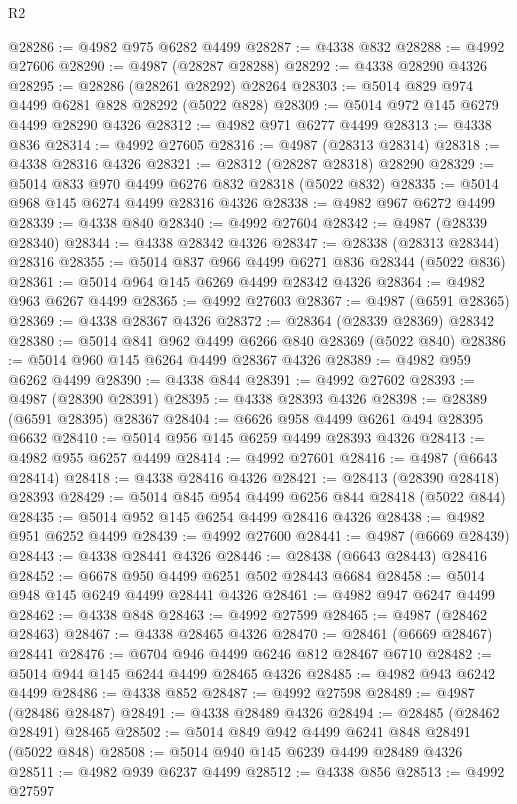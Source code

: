 \begin{lexlean}{R2}
\begin{coremodule}
@28286 := @4982 @975 @6282 @4499
@28287 := @4338 @832
@28288 := @4992 @27606
@28290 := @4987 (@28287 @28288)
@28292 := @4338 @28290 @4326
@28295 := @28286 (@28261 @28292) @28264
@28303 := @5014 @829 @974 @4499 @6281 @828 @28292 (@5022 @828)
@28309 := @5014 @972 @145 @6279 @4499 @28290 @4326
@28312 := @4982 @971 @6277 @4499
@28313 := @4338 @836
@28314 := @4992 @27605
@28316 := @4987 (@28313 @28314)
@28318 := @4338 @28316 @4326
@28321 := @28312 (@28287 @28318) @28290
@28329 := @5014 @833 @970 @4499 @6276 @832 @28318 (@5022 @832)
@28335 := @5014 @968 @145 @6274 @4499 @28316 @4326
@28338 := @4982 @967 @6272 @4499
@28339 := @4338 @840
@28340 := @4992 @27604
@28342 := @4987 (@28339 @28340)
@28344 := @4338 @28342 @4326
@28347 := @28338 (@28313 @28344) @28316
@28355 := @5014 @837 @966 @4499 @6271 @836 @28344 (@5022 @836)
@28361 := @5014 @964 @145 @6269 @4499 @28342 @4326
@28364 := @4982 @963 @6267 @4499
@28365 := @4992 @27603
@28367 := @4987 (@6591 @28365)
@28369 := @4338 @28367 @4326
@28372 := @28364 (@28339 @28369) @28342
@28380 := @5014 @841 @962 @4499 @6266 @840 @28369 (@5022 @840)
@28386 := @5014 @960 @145 @6264 @4499 @28367 @4326
@28389 := @4982 @959 @6262 @4499
@28390 := @4338 @844
@28391 := @4992 @27602
@28393 := @4987 (@28390 @28391)
@28395 := @4338 @28393 @4326
@28398 := @28389 (@6591 @28395) @28367
@28404 := @6626 @958 @4499 @6261 @494 @28395 @6632
@28410 := @5014 @956 @145 @6259 @4499 @28393 @4326
@28413 := @4982 @955 @6257 @4499
@28414 := @4992 @27601
@28416 := @4987 (@6643 @28414)
@28418 := @4338 @28416 @4326
@28421 := @28413 (@28390 @28418) @28393
@28429 := @5014 @845 @954 @4499 @6256 @844 @28418 (@5022 @844)
@28435 := @5014 @952 @145 @6254 @4499 @28416 @4326
@28438 := @4982 @951 @6252 @4499
@28439 := @4992 @27600
@28441 := @4987 (@6669 @28439)
@28443 := @4338 @28441 @4326
@28446 := @28438 (@6643 @28443) @28416
@28452 := @6678 @950 @4499 @6251 @502 @28443 @6684
@28458 := @5014 @948 @145 @6249 @4499 @28441 @4326
@28461 := @4982 @947 @6247 @4499
@28462 := @4338 @848
@28463 := @4992 @27599
@28465 := @4987 (@28462 @28463)
@28467 := @4338 @28465 @4326
@28470 := @28461 (@6669 @28467) @28441
@28476 := @6704 @946 @4499 @6246 @812 @28467 @6710
@28482 := @5014 @944 @145 @6244 @4499 @28465 @4326
@28485 := @4982 @943 @6242 @4499
@28486 := @4338 @852
@28487 := @4992 @27598
@28489 := @4987 (@28486 @28487)
@28491 := @4338 @28489 @4326
@28494 := @28485 (@28462 @28491) @28465
@28502 := @5014 @849 @942 @4499 @6241 @848 @28491 (@5022 @848)
@28508 := @5014 @940 @145 @6239 @4499 @28489 @4326
@28511 := @4982 @939 @6237 @4499
@28512 := @4338 @856
@28513 := @4992 @27597

\end{coremodule}
\end{lexlean}
